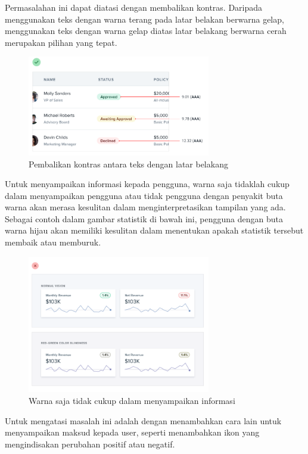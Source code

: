 Permasalahan ini dapat diatasi dengan membalikan kontras. Daripada menggunakan teks dengan warna terang pada latar belakan berwarna gelap, menggunakan teks dengan warna gelap diatas latar belakang berwarna cerah merupakan pilihan yang tepat.

\begin{figure}[H]
	{\centering
		\includegraphics[keepaspectratio, width=8cm]{gambar/g-104.png}
		\caption{Pembalikan kontras antara teks dengan latar belakang \citep{refactoringui}}}
	\label{gambar:g-104.png}
\end{figure}

Untuk menyampaikan informasi kepada pengguna, warna saja tidaklah cukup dalam menyampaikan pengguna atau tidak pengguna dengan penyakit buta warna akan merasa kesulitan dalam menginterpretasikan tampilan yang ada. Sebagai contoh dalam gambar statistik di bawah ini, pengguna dengan buta warna hijau akan memiliki kesulitan dalam menentukan apakah statistik tersebut membaik atau memburuk.

\begin{figure}[H]
	{\centering
		\includegraphics[keepaspectratio, width=8cm]{gambar/g-105.png}
		\caption{Warna saja tidak cukup dalam menyampaikan informasi \citep{refactoringui}}}
	\label{gambar:g-105.png}
\end{figure}

Untuk mengatasi masalah ini adalah dengan menambahkan cara lain untuk menyampaikan maksud kepada user, seperti menambahkan ikon yang mengindisakan perubahan positif atau negatif.

